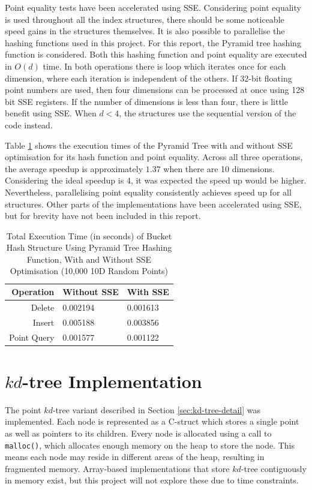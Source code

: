 Point equality tests have been accelerated using SSE. Considering point equality is used throughout all the index structures, there should be some noticeable speed gains in the structures themselves. It is also possible to parallelise the hashing functions used in this project. For this report, the Pyramid tree hashing function is considered. Both this hashing function and point equality are executed in $O(d)$ time. In both operations there is loop which iterates once for each dimension, where each iteration is independent of the others. If 32-bit floating point numbers are used, then four dimensions can be processed at once using 128 bit SSE registers. If the number of dimensions is less than four, there is little benefit using SSE. When $d<4$, the structures use the sequential version of the code instead.

Table \ref{tab:pyramid-sse} shows the execution times of the Pyramid Tree with and without SSE optimisation for its hash function and point equality. Across all three operations, the average speedup is approximately $1.37$ when there are 10 dimensions. Considering the ideal speedup is 4, it was expected the speed up would be higher. Nevertheless, parallelising point equality consistently achieves speed up for all structures. Other parts of the implementations have been accelerated using SSE, but for brevity have not been included in this report.

\begin{table}
	\centering
	\begin{tabular}{|r|l|l|}
		\hline
		\textbf{Operation} & \textbf{Without SSE} & \textbf{With SSE} \\
		\hline
		Delete & 0.002194 & 0.001613 \\
		Insert & 0.005188 & 0.003856 \\
		Point Query & 0.001577 & 0.001122 \\
		\hline
	\end{tabular}
	\caption{Total Execution Time (in seconds) of Bucket Hash Structure Using Pyramid Tree Hashing Function, With and Without SSE Optimisation (10,000 10D Random Points)}
	\label{tab:pyramid-sse}
\end{table}

\section{$kd$-tree Implementation}

The point $kd$-tree variant described in Section \ref{sec:kd-tree-detail} was implemented. Each node is represented as a C-struct which stores a single point as well as pointers to its children. Every node is allocated using a call to \texttt{malloc()}, which allocates enough memory on the heap to store the node. This means each node may reside in different areas of the heap, resulting in fragmented memory. Array-based implementations that store $kd$-tree contiguously in memory exist, but this project will not explore these due to time constraints.